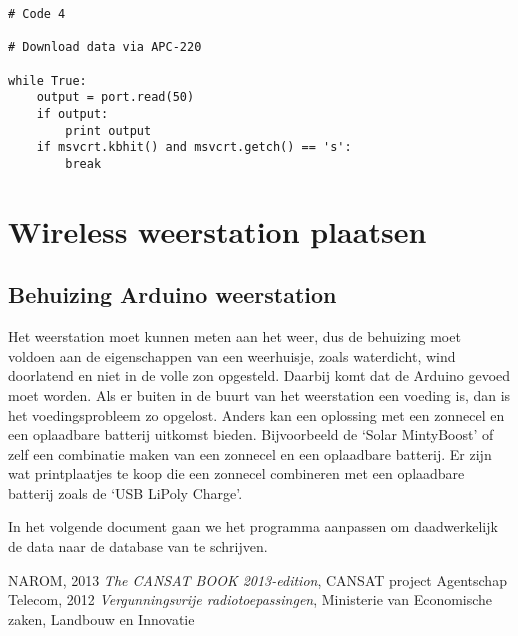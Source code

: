 \begin{verbatim}
# Code 4

# Download data via APC-220  
 
while True:
    output = port.read(50)
    if output:
        print output
    if msvcrt.kbhit() and msvcrt.getch() == 's':
        break
\end{verbatim}

\section{Wireless weerstation plaatsen}

\subsection{Behuizing Arduino weerstation} Het weerstation moet kunnen
meten aan het weer, dus de behuizing moet voldoen aan de eigenschappen
van een weerhuisje, zoals waterdicht, wind doorlatend en niet in de
volle zon opgesteld. Daarbij komt dat de Arduino gevoed moet worden. Als
er buiten in de buurt van het weerstation een voeding is, dan is het
voedingsprobleem zo opgelost. Anders kan een oplossing met een zonnecel
en een oplaadbare batterij uitkomst bieden. Bijvoorbeeld de `Solar
MintyBoost' of zelf een combinatie maken van een zonnecel en een
oplaadbare batterij. Er zijn wat printplaatjes te koop die een zonnecel
combineren met een oplaadbare batterij zoals de `USB LiPoly Charge'.

In het volgende document gaan we het programma aanpassen om daadwerkelijk de 
data naar de database van \hisparc te schrijven. 


 
\begin{thebibliography}{9}
        NAROM, 2013 \emph{The CANSAT BOOK 2013-edition}, 
        CANSAT project
    Agentschap Telecom, 2012 \emph{Vergunningsvrije radiotoepassingen}, 
    Ministerie van Economische zaken, Landbouw en Innovatie
\end{thebibliography}



